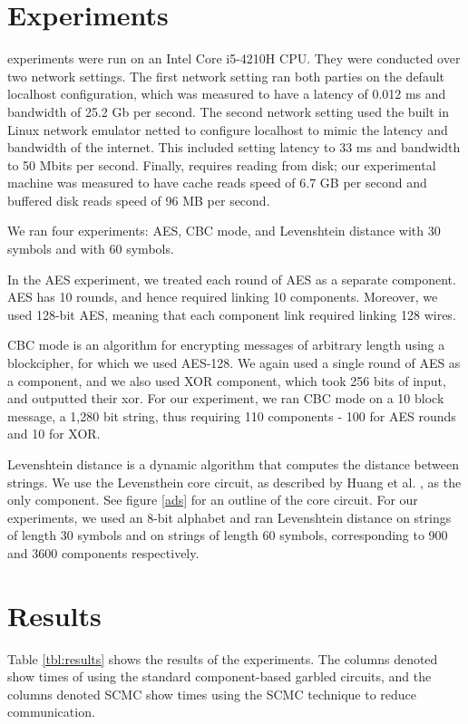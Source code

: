 \section{Experiments}
\CompGC experiments were run on an Intel Core i5-4210H CPU. 
They were conducted over two network settings. 
The first network setting ran both parties on the default localhost configuration, which was measured to have a latency of 0.012 ms and bandwidth of 25.2 Gb per second. 
The second network setting used the built in Linux network emulator {\sf netted} to configure localhost to mimic the latency and bandwidth of the internet. 
This included setting latency to 33 ms and bandwidth to 50 Mbits per second. 
Finally, \CompGC requires reading from disk; our experimental machine was measured to have cache reads speed of 6.7 GB per second and buffered disk reads speed of 96 MB per second.

We ran four experiments: AES, CBC mode, and Levenshtein distance with 30 symbols and with 60 symbols. 

In the AES experiment, we treated each round of AES as a separate component. AES has 10 rounds, and hence required linking 10 components. Moreover, we used 128-bit AES, meaning that each component link required linking 128 wires. 

CBC mode is an algorithm for encrypting messages of arbitrary length using a blockcipher, for which we used AES-128. 
We again used a single round of AES as a component, and we also used XOR component, which took 256 bits of input, and outputted their xor. 
For our experiment, we ran CBC mode on a 10 block message, a 1,280 bit string, thus requiring 110 components - 100 for AES rounds and 10 for XOR. 

Levenshtein distance is a dynamic algorithm that computes the distance between strings. 
We use the Levensthein core circuit, as described by Huang et al. \cite{asdf}, as the only component. 
See figure \ref{ads} for an outline of the core circuit. 
For our experiments, we used an 8-bit alphabet and ran Levenshtein distance on strings of length 30 symbols and on strings of length 60 symbols, corresponding to 900 and 3600 components respectively. 

\section{Results}




Table \ref{tbl:results} shows the results of the experiments. 
The columns denoted \Naive show times of \CompGC using the standard component-based garbled circuits, and the columns denoted SCMC show times using the SCMC technique to reduce communication.

